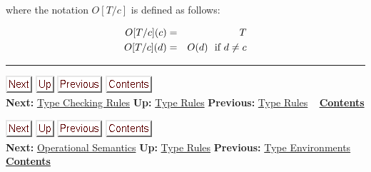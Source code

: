 \documentclass[]{article}
\begin{document}
where the notation $O[T/c]$ is defined as follows:

\begin{eqnarray*}
O[T/c](c) & = & T \\
O[T/c](d) & = & O(d)\ \ \mbox {\rm if\ }d \neq c
\end{eqnarray*}

\begin{center}\rule{3in}{0.4pt}\end{center}

\href{node43.html}{\includegraphics{next.png}}
\href{node41.html}{\includegraphics{up.png}}
\href{node41.html}{\includegraphics{prev.png}}
\href{node1.html}{\includegraphics{contents.png}} \\ \textbf{Next:}
\href{node43.html}{Type Checking Rules} \textbf{Up:}
\href{node41.html}{Type Rules} \textbf{Previous:}
\href{node41.html}{Type Rules} ~ \textbf{\href{node1.html}{Contents}}

\href{node44.html}{\includegraphics{next.png}}
\href{node41.html}{\includegraphics{up.png}}
\href{node42.html}{\includegraphics{prev.png}}
\href{node1.html}{\includegraphics{contents.png}} \\ \textbf{Next:}
\href{node44.html}{Operational Semantics} \textbf{Up:}
\href{node41.html}{Type Rules} \textbf{Previous:}
\href{node42.html}{Type Environments} ~
\textbf{\href{node1.html}{Contents}} \\ \\
\end{document}
